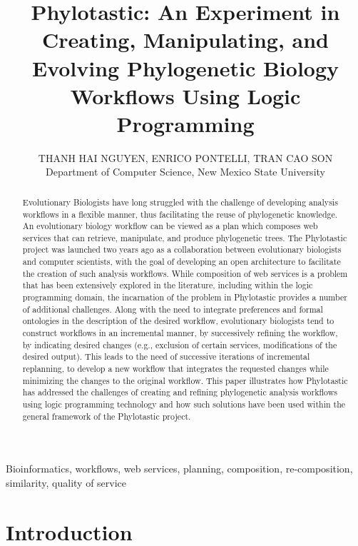 \documentclass{new_tlp}
\title[Creating Phylotastic]
        {Phylotastic: An Experiment in Creating, Manipulating, and Evolving
        	 Phylogenetic Biology Workflows Using Logic Programming}
\author[T. Nguyen, E. Pontelli, T. C. Son]
         {THANH HAI NGUYEN, ENRICO PONTELLI, TRAN CAO SON\\
         	Department of Computer Science,
         	New Mexico State University\\
         \email{thanhnh | epontell | @nmsu.edu, tson@cs.nmsu.edu}}
\begin{document}


\label{firstpage}

\maketitle
 


  \begin{abstract}
    Evolutionary Biologists have long struggled with the challenge of developing 
    analysis workflows in a flexible manner, thus facilitating the reuse of phylogenetic
    knowledge. An evolutionary biology workflow can be viewed as a plan which composes web
    services that can retrieve, manipulate, and produce phylogenetic trees.
    The Phylotastic project was launched two years ago as a collaboration between evolutionary
    biologists and computer scientists, with the goal of developing an open architecture to facilitate
    the creation of such analysis workflows. While composition of web services is a problem that
    has been extensively explored in the literature, including within the logic programming domain,
    the incarnation of the problem in Phylotastic provides a number of additional challenges. 
    Along with the need to integrate preferences and formal ontologies in the description of the
    desired workflow, evolutionary biologists tend to construct workflows in an incremental manner,
    by successively refining the workflow, by indicating desired changes (e.g., exclusion of
    certain services, modifications of the desired output). This leads to the need of 
    successive iterations of incremental replanning, to develop a new workflow that integrates
    the requested changes while minimizing the changes to the original workflow. 
  This paper illustrates how Phylotastic has addressed the challenges of creating and refining
  phylogenetic analysis workflows using logic programming technology and how such solutions have
  been used within the general framework of the Phylotastic project. 
  \end{abstract}

  \begin{keywords}
    Bioinformatics, workflows, web services, planning, composition, re-composition, similarity, quality of 
    service
  \end{keywords}

\section{Introduction}
\end{document}
